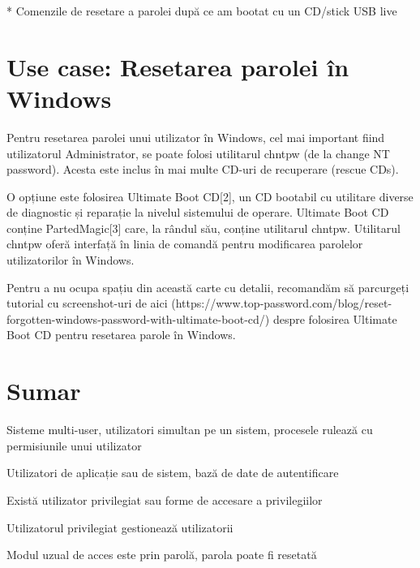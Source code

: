 * Comenzile de resetare a parolei după ce am bootat cu un CD/stick USB live

\section{Use case: Resetarea parolei în Windows}
\label{sec:users-pass-restore-window}

Pentru resetarea parolei unui utilizator în Windows, cel mai important fiind
utilizatorul Administrator, se poate folosi utilitarul chntpw (de la change NT
password). Acesta este inclus în mai multe CD-uri de recuperare (rescue CDs).

O opțiune este folosirea Ultimate Boot CD[2], un CD bootabil cu utilitare
diverse de diagnostic și reparație la nivelul sistemului de operare. Ultimate
Boot CD conține PartedMagic[3] care, la rândul său, conține utilitarul chntpw.
Utilitarul chntpw oferă interfață în linia de comandă pentru modificarea
parolelor utilizatorilor în Windows.

Pentru a nu ocupa spațiu din această carte cu detalii, recomandăm să parcurgeți
tutorial cu screenshot-uri de aici
(https://www.top-password.com/blog/reset-forgotten-windows-password-with-ultimate-boot-cd/)
despre folosirea Ultimate Boot CD pentru resetarea parole în Windows.

\section{Sumar}
\label{sec:users-sumar}

Sisteme multi-user, utilizatori simultan pe un sistem, procesele rulează cu
permisiunile unui utilizator

Utilizatori de aplicație sau de sistem, bază de date de autentificare

Există utilizator privilegiat sau forme de accesare a privilegiilor

Utilizatorul privilegiat gestionează utilizatorii

Modul uzual de acces este prin parolă, parola poate fi resetată
